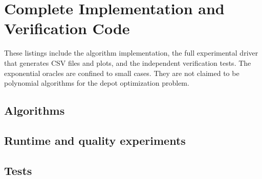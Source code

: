 \documentclass[sigconf,nonacm]{acmart}
\begin{document}
\section{Complete Implementation and Verification Code}\label{app:code}
These listings include the algorithm implementation, the full experimental
driver that generates CSV files and plots, and the independent verification
tests. The exponential oracles are confined to small cases. They are not
claimed to be polynomial algorithms for the depot optimization problem.
\subsection{Algorithms}

\subsection{Runtime and quality experiments}

\subsection{Tests}

\end{document}
